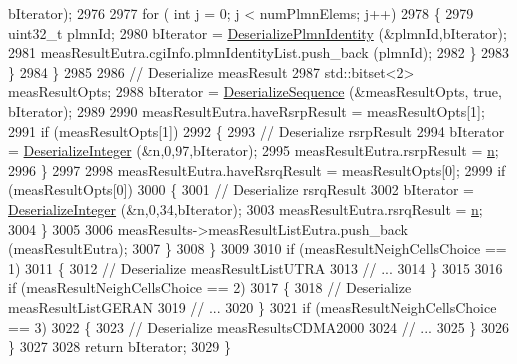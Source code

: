 \begin{DoxyCode}
      bIterator);
2976 
2977                       \textcolor{keywordflow}{for} ( \textcolor{keywordtype}{int} j = 0; j < numPlmnElems; j++)
2978                         \{
2979                           uint32\_t plmnId;
2980                           bIterator = \hyperlink{classns3_1_1RrcAsn1Header_a50855ae1c2fda4b56c194497755971d6}{DeserializePlmnIdentity} (&plmnId,bIterator);
2981                           measResultEutra.cgiInfo.plmnIdentityList.push\_back (plmnId);
2982                         \}
2983                     \}
2984                 \}
2985 
2986               \textcolor{comment}{// Deserialize measResult}
2987               std::bitset<2> measResultOpts;
2988               bIterator = \hyperlink{classns3_1_1Asn1Header_a58c68bb97ba3fe2e8fcdd7c208d672b2}{DeserializeSequence} (&measResultOpts, \textcolor{keyword}{true}, bIterator);
2989 
2990               measResultEutra.haveRsrpResult = measResultOpts[1];
2991               \textcolor{keywordflow}{if} (measResultOpts[1])
2992                 \{
2993                   \textcolor{comment}{// Deserialize rsrpResult}
2994                   bIterator = \hyperlink{classns3_1_1Asn1Header_a49802c9af30018b078150e866b6ecae2}{DeserializeInteger} (&n,0,97,bIterator);
2995                   measResultEutra.rsrpResult = \hyperlink{namespacesample-rng-plot_aeb5ee5c431e338ef39b7ac5431242e1d}{n};
2996                 \}
2997 
2998               measResultEutra.haveRsrqResult = measResultOpts[0];
2999               \textcolor{keywordflow}{if} (measResultOpts[0])
3000                 \{
3001                   \textcolor{comment}{// Deserialize rsrqResult}
3002                   bIterator = \hyperlink{classns3_1_1Asn1Header_a49802c9af30018b078150e866b6ecae2}{DeserializeInteger} (&n,0,34,bIterator);
3003                   measResultEutra.rsrqResult = \hyperlink{namespacesample-rng-plot_aeb5ee5c431e338ef39b7ac5431242e1d}{n};
3004                 \}
3005 
3006               measResults->measResultListEutra.push\_back (measResultEutra);
3007             \}
3008         \}
3009 
3010       \textcolor{keywordflow}{if} (measResultNeighCellsChoice == 1)
3011         \{
3012           \textcolor{comment}{// Deserialize measResultListUTRA}
3013           \textcolor{comment}{// ...}
3014         \}
3015 
3016       \textcolor{keywordflow}{if} (measResultNeighCellsChoice == 2)
3017         \{
3018           \textcolor{comment}{// Deserialize measResultListGERAN}
3019           \textcolor{comment}{// ...}
3020         \}
3021       \textcolor{keywordflow}{if} (measResultNeighCellsChoice == 3)
3022         \{
3023           \textcolor{comment}{// Deserialize measResultsCDMA2000}
3024           \textcolor{comment}{// ...}
3025         \}
3026     \}
3027 
3028   \textcolor{keywordflow}{return} bIterator;
3029 \}
\end{DoxyCode}


